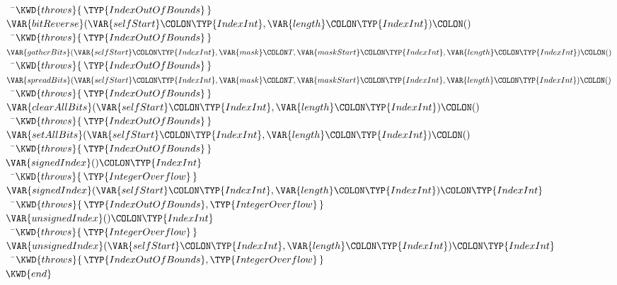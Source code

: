 \begin{Fortress}
{\tt~~}\pushtabs\=\+\(    \KWD{throws} \{\,\TYP{IndexOutOfBounds}\,\}\)\-\\\poptabs
\(  \VAR{bitReverse}(\VAR{selfStart}\COLON \TYP{IndexInt}, \VAR{length}\COLON \TYP{IndexInt})\COLON ()\)\\
{\tt~~}\pushtabs\=\+\(    \KWD{throws} \{\,\TYP{IndexOutOfBounds}\,\}\)\-\\\poptabs
\(  \VAR{gatherBits}(\VAR{selfStart}\COLON \TYP{IndexInt}, \VAR{mask}\COLON T, \VAR{maskStart}\COLON \TYP{IndexInt}, \VAR{length}\COLON \TYP{IndexInt})\COLON ()\)\\
{\tt~~}\pushtabs\=\+\(    \KWD{throws} \{\,\TYP{IndexOutOfBounds}\,\}\)\-\\\poptabs
\(  \VAR{spreadBits}(\VAR{selfStart}\COLON \TYP{IndexInt}, \VAR{mask}\COLON T, \VAR{maskStart}\COLON \TYP{IndexInt}, \VAR{length}\COLON \TYP{IndexInt})\COLON ()\)\\
{\tt~~}\pushtabs\=\+\(    \KWD{throws} \{\,\TYP{IndexOutOfBounds}\,\}\)\-\\\poptabs
\(  \VAR{clearAllBits}(\VAR{selfStart}\COLON \TYP{IndexInt}, \VAR{length}\COLON \TYP{IndexInt})\COLON ()\)\\
{\tt~~}\pushtabs\=\+\(    \KWD{throws} \{\,\TYP{IndexOutOfBounds}\,\}\)\-\\\poptabs
\(  \VAR{setAllBits}(\VAR{selfStart}\COLON \TYP{IndexInt}, \VAR{length}\COLON \TYP{IndexInt})\COLON ()\)\\
{\tt~~}\pushtabs\=\+\(    \KWD{throws} \{\,\TYP{IndexOutOfBounds}\,\}\)\-\\\poptabs
\(  \VAR{signedIndex}()\COLON \TYP{IndexInt}\)\\
{\tt~~}\pushtabs\=\+\(    \KWD{throws} \{\,\TYP{IntegerOverflow}\,\}\)\-\\\poptabs
\(  \VAR{signedIndex}(\VAR{selfStart}\COLON \TYP{IndexInt}, \VAR{length}\COLON \TYP{IndexInt})\COLON \TYP{IndexInt}\)\\
{\tt~~}\pushtabs\=\+\(    \KWD{throws} \{\,\TYP{IndexOutOfBounds}, \TYP{IntegerOverflow}\,\}\)\-\\\poptabs
\(  \VAR{unsignedIndex}()\COLON \TYP{IndexInt}\)\\
{\tt~~}\pushtabs\=\+\(    \KWD{throws} \{\,\TYP{IntegerOverflow}\,\}\)\-\\\poptabs
\(  \VAR{unsignedIndex}(\VAR{selfStart}\COLON \TYP{IndexInt}, \VAR{length}\COLON \TYP{IndexInt})\COLON \TYP{IndexInt}\)\\
{\tt~~}\pushtabs\=\+\(    \KWD{throws} \{\,\TYP{IndexOutOfBounds}, \TYP{IntegerOverflow}\,\}\)\-\-\\\poptabs\poptabs
\(\KWD{end}\)
\end{Fortress}


